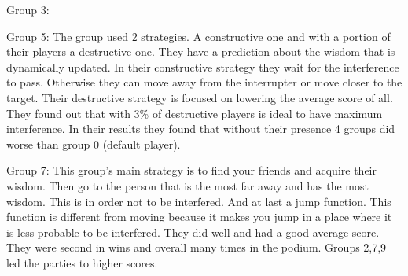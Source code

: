 Group 3:


Group 5:
The group used 2 strategies. A constructive one and with a portion of their players
a destructive one. They have a prediction about the wisdom that is dynamically 
updated. In their constructive strategy they wait for the interference to pass.
Otherwise they can move away from the interrupter or move closer to the target.
Their destructive strategy is focused on lowering the average score of all.
They found out that with 3\% of destructive players is ideal to have maximum 
interference. In their results they found that without their presence 4 groups
did worse than group 0 (default player).

Group 7:
This group's main strategy is to find your friends and acquire their wisdom. Then
go to the person that is the most far away and has the most wisdom. This is in 
order not to be interfered. And at last a jump function. This function is 
different from moving because it makes you jump in a place where it is less 
probable to be interfered. They did well and had a good average score. They were
second in wins and overall many times in the podium. Groups 2,7,9 led the parties 
to higher scores.

